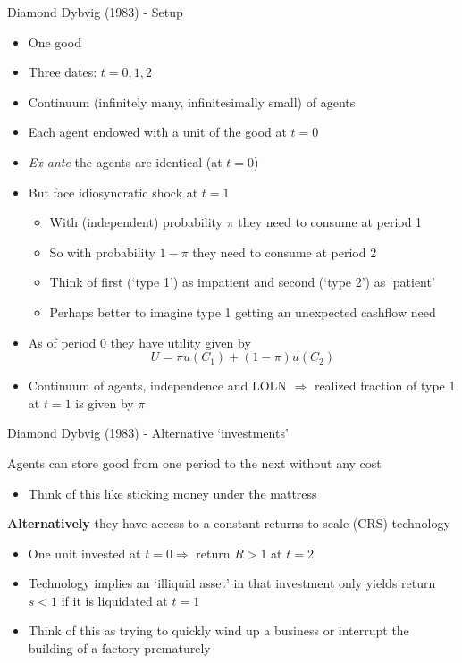 \begin{frame}{Diamond Dybvig (1983) - Setup}

\begin{itemize}
\item	One good
\item	Three dates: $t=0,1,2$
\item	Continuum (infinitely many, infinitesimally small) of agents
\item	Each agent endowed with a unit of the good at $t=0$
\item	\emph{Ex ante} the agents are identical (at $t=0$)
\item	But face idiosyncratic shock at $t=1$
	\begin{itemize}
	\item	With (independent) probability $\pi$ they need to consume at period 1
	\item	So with probability $1-\pi$ they need to consume at period 2
	\item	Think of first (`type 1') as impatient and second (`type 2') as `patient'
	\item	Perhaps better to imagine type 1 getting an unexpected cashflow need
	\end{itemize}
\item	As of period $0$ they have utility given by
\[
U = \pi u(C_{1}) + (1-\pi)u(C_{2})
\]
\item	Continuum of agents, independence and LOLN $\Rightarrow$ realized fraction of type 1 at $t=1$ is given by $\pi$
\end{itemize}

\end{frame}



\begin{frame}{Diamond Dybvig (1983) - Alternative `investments'}

Agents can store good from one period to the next without any cost
	\begin{itemize}
	\item	Think of this like sticking money under the mattress
	\end{itemize}
\vspace{2mm}
\textbf{Alternatively} they have access to a constant returns to scale (CRS) technology
	\begin{itemize}
	\item	One unit invested at $t=0 \Rightarrow$ return $R>1$ at $t=2$
	\item	Technology implies an `illiquid asset' in that investment only yields return $s<1$ if it is liquidated at $t=1$
	\item	Think of this as trying to quickly wind up a business or interrupt the building of a factory prematurely
	\end{itemize}
\end{frame}

